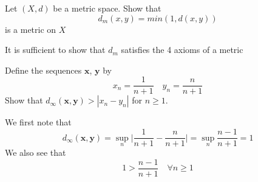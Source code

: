 \documentclass{homework}
\begin{document}
\begin{problem}[2-6]
  Let $(X,d)$ be a metric space. Show that
  \[d_m(x,y) = min(1, d(x,y))\]
  is a metric on $X$
\end{problem}

\begin{solution}
  It is sufficient to show that $d_m$ satisfies the 4 axioms of a metric

\end{solution}

\begin{problem}[2-7]
    Define the sequences $\mathbf{x}$, $\mathbf{y}$ by
    \[x_n = \frac{1}{n + 1} \quad y_n = \frac{n}{n + 1}\]
    Show that $d_{\infty}(\mathbf{x},\mathbf{y}) > |x_n - y_n|$ for $n\geq1$.
\end{problem}

\begin{solution}
  We first note that
  \[d_{\infty}(\mathbf{x},\mathbf{y}) = \sup_n \big\lvert\frac{1}{n+1} - \frac{n}{n+1}\big\rvert = \sup_n\frac{n - 1}{n+1} = 1\]
  We also see that 
  \[1 > \frac{n - 1}{n + 1} \quad \forall n \geq 1\]
\end{solution}

\begin{problem}[2-30]
\end{problem}

\begin{solution}
\end{solution}
\end{document}
